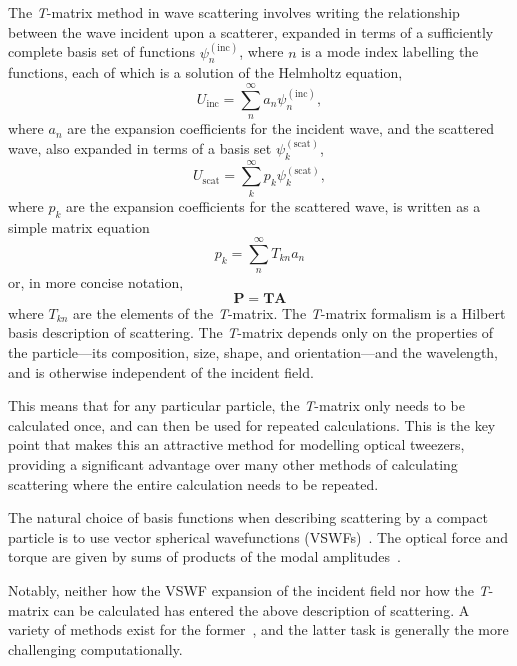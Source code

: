 \documentclass{article}
\begin{document}
The \textit{T}-matrix method in wave scattering involves writing the
relationship between the wave incident upon a scatterer, expanded in terms of
a sufficiently complete basis set of functions $\psi_n^{(\mathrm{inc})}$,
where $n$ is a mode index labelling the functions, each of which is a
solution of the Helmholtz equation,
\begin{equation}
U_\mathrm{inc} = \sum_n^\infty a_n \psi_n^{(\mathrm{inc})},
\label{exp1}
\end{equation}
where $a_n$ are the expansion coefficients for the incident wave,
and the scattered wave, also expanded in terms of a basis set
$\psi_k^{(\mathrm{scat})}$,
\begin{equation}
U_\mathrm{scat} = \sum_k^\infty p_k \psi_k^{(\mathrm{scat})},
\label{exp2}
\end{equation}
where $p_k$ are the expansion coefficients for the scattered wave,
is written as a simple matrix equation
\begin{equation}
p_k = \sum_n^\infty T_{kn} a_n
\end{equation}
or,  in more concise notation,
\begin{equation}
\mathbf{P} = \mathbf{T} \mathbf{A}
\end{equation}
where $T_{kn}$ are the elements of the \textit{T}-matrix. The
\textit{T}-matrix formalism is a Hilbert basis description of
scattering. The \textit{T}-matrix depends only on the properties of the
particle---its composition,  size,
shape, and orientation---and the wavelength, and is otherwise
independent of the incident field.

This means
that for any particular particle, the \textit{T}-matrix only needs to be
calculated once, and can then be used for repeated calculations.
This is the key point that makes this an attractive method for modelling
optical tweezers, providing a
significant advantage over many other methods of calculating scattering where
the entire calculation needs to be repeated.

The natural choice of basis functions when describing scattering
by a compact particle is to use vector spherical wavefunctions
(VSWFs)~\cite{waterman1971}.
The optical force and torque are given by sums of products of the modal
amplitudes~\cite{farsund1996,crichton2000,nieminen2004d}.

Notably, neither how the VSWF expansion of the incident field nor how
the \textit{T}-matrix can be calculated has entered the above description
of scattering.
A variety of methods exist for the
former~\cite{nieminen2003a,nieminen2004d}, and the latter task is generally
the more challenging computationally.
\end{document}
